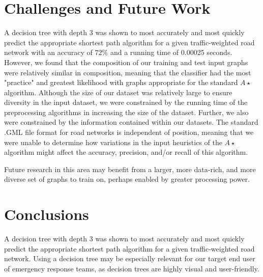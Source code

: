 \documentclass{article}
\begin{document}
\section{Challenges and Future Work}

A decision tree with depth 3 was shown to most accurately and most quickly predict the appropriate shortest path algorithm for a given traffic-weighted road network with an accuracy of $72\%$ and a running time of 0.00025 seconds. However, we found that the composition of our training and test input graphs were relatively similar in composition, meaning that the classifier had the most "practice" and greatest likelihood with graphs appropriate for the standard $A\star$ algorithm. Although the size of our dataset was relatively large to ensure diversity in the input dataset, we were constrained by the running time of the preprocessing algorithms in increasing the size of the dataset. Further, we also were constrained by the information contained within our datasets. The standard .GML file format for road networks is independent of position, meaning that we were unable to determine how variations in the input heuristics of the $A\star$ algorithm might affect the accuracy, precision, and/or recall of this algorithm.

Future research in this area may benefit from a larger, more data-rich, and more diverse set of graphs to train on, perhaps enabled by greater processing power. 

\section{Conclusions}

A decision tree with depth 3 was shown to most accurately and most quickly predict the appropriate shortest path algorithm for a given traffic-weighted road network. Using a decision tree may be especially relevant for our target end user of emergency response teams, as decision trees are highly visual and user-friendly. 



\end{document}
